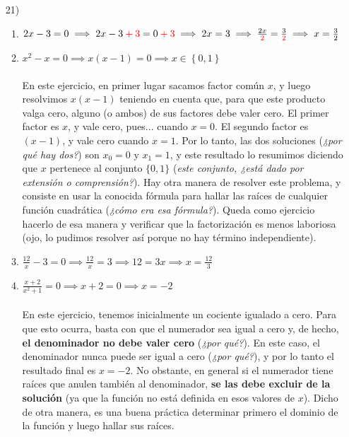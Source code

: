 \documentclass[12pt]{article}
\makeatletter
\def\mcolor#1#{\@mcolor{#1}}
\def\@mcolor#1#2#3{\protect\leavevmode\color#1{#2}#3\color{black}}
\makeatother
\begin{document}
\begin{enumerate}
\item[21)] 
  \begin{enumerate}
	\item $2x - 3 = 0 \implies 2x - 3 \mcolor{red}{+ 3} = 0 \mcolor{red}{+ 3} \implies 2x = 3 \implies \frac{2x}{\mcolor{red}{2}} = \frac{3}{\mcolor{red}{2}} \implies x = \frac{3}{2}$
	\item $x^2 - x = 0 \implies x\left(x - 1\right) = 0 \implies x \in \left\{0,1\right\}$\\
	\\
	En este ejercicio, en primer lugar sacamos factor común $x$, y luego resolvimos $x\left(x - 1\right)$ teniendo en cuenta que, para que este producto valga cero, alguno (o ambos) de sus factores debe valer cero. El primer factor es $x$, y vale cero, pues... cuando $x = 0$. El segundo factor es $\left(x - 1\right)$, y vale cero cuando $x = 1$. Por lo tanto, las dos soluciones (\textit{¿por qué hay dos?}) son $x_0 = 0$ y $x_1 = 1$, y este resultado lo resumimos diciendo que $x$ pertenece al conjunto $\{0,1\}$ (\textit{este conjunto, ¿está dado por extensión o comprensión?}). Hay otra manera de resolver este problema, y consiste en usar la conocida fórmula para hallar las raíces de cualquier función cuadrática (\textit{¿cómo era esa fórmula?}). Queda como ejercicio hacerlo de esa manera y verificar que la factorización es menos laboriosa (ojo, lo pudimos resolver así porque no hay término independiente).
	\item $\frac{12}{x} - 3 = 0 \implies \frac{12}{x} = 3 \implies 12 = 3x \implies x = \frac{12}{3}$
	\item $\frac{x + 2}{x^2 + 1} = 0 \implies x + 2 = 0 \implies x = -2$\\
	\\
	En este ejercicio, tenemos inicialmente un cociente igualado a cero. Para que esto ocurra, basta con que el numerador sea igual a cero y, de hecho, \textbf{el denominador no debe valer cero} (\textit{¿por qué?}). En este caso, el denominador nunca puede ser igual a cero (\textit{¿por qué?}), y por lo tanto el resultado final es $x = -2$. No obstante, en general si el numerador tiene raíces que anulen también al denominador, \textbf{se las debe excluir de la solución} (ya que la función no está definida en esos valores de $x$). Dicho de otra manera, es una buena práctica determinar primero el dominio de la función y luego hallar sus raíces.
	

\end{enumerate}
\end{enumerate}
\end{document}
